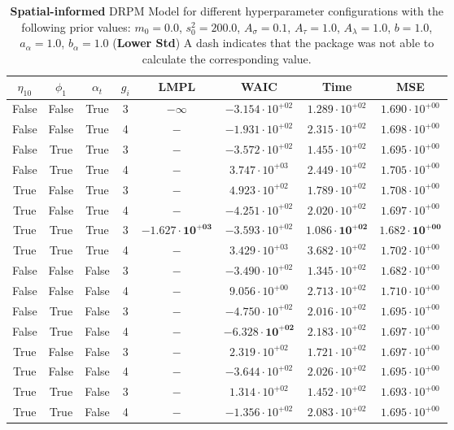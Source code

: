 \documentclass[12pt,a4paper]{article}
\begin{document}
\begin{table}
\caption{\textbf{Spatial-informed} DRPM Model for different hyperparameter configurations with the following prior values: $m_0 = 0.0$, $s_0^2 
= 200.0$, $A_\sigma = 0.1$, $A_\tau = 1.0$, $A_\lambda = 1.0$, $b = 1.0$, $a_\alpha = 1.0$, $b_\alpha = 1.0$ (\textbf{Lower Std})
A dash indicates that the package was not able to calculate the corresponding value.}
\centering\begin{tabular}{cccccccc}
\toprule
$\eta_{10}$ & $\phi_1$ & $\alpha_t$ & $g_i$ & LMPL & WAIC & Time & MSE \\
\midrule
False & False & True & 3 & $-\infty$ & $-3.154 \cdot 10^{+02}$ & $1.289 \cdot 10^{+02}$ & $1.690 \cdot 10^{+00}$ \\
False & False & True & 4 & $-$ & $-1.931 \cdot 10^{+02}$ & $2.315 \cdot 10^{+02}$ & $1.698 \cdot 10^{+00}$ \\
False & True & True & 3 & $-$ & $-3.572 \cdot 10^{+02}$ & $1.455 \cdot 10^{+02}$ & $1.695 \cdot 10^{+00}$ \\
False & True & True & 4 & $-$ & $3.747 \cdot 10^{+03}$ & $2.449 \cdot 10^{+02}$ & $1.705 \cdot 10^{+00}$ \\
True & False & True & 3 & $-$ & $4.923 \cdot 10^{+02}$ & $1.789 \cdot 10^{+02}$ & $1.708 \cdot 10^{+00}$ \\
True & False & True & 4 & $-$ & $-4.251 \cdot 10^{+02}$ & $2.020 \cdot 10^{+02}$ & $1.697 \cdot 10^{+00}$ \\
True & True & True & 3 & $\mathbf{-1.627 \cdot 10^{+03}}$ & $-3.593 \cdot 10^{+02}$ & $\mathbf{1.086 \cdot 10^{+02}}$ & $\mathbf{1.682 \cdot 10^{+00}}$ \\
True & True & True & 4 & $-$ & $3.429 \cdot 10^{+03}$ & $3.682 \cdot 10^{+02}$ & $1.702 \cdot 10^{+00}$ \\
False & False & False & 3 & $-$ & $-3.490 \cdot 10^{+02}$ & $1.345 \cdot 10^{+02}$ & $1.682 \cdot 10^{+00}$ \\
False & False & False & 4 & $-$ & $9.056 \cdot 10^{+00}$ & $2.713 \cdot 10^{+02}$ & $1.710 \cdot 10^{+00}$ \\
False & True & False & 3 & $-$ & $-4.750 \cdot 10^{+02}$ & $2.016 \cdot 10^{+02}$ & $1.695 \cdot 10^{+00}$ \\
False & True & False & 4 & $-$ & $\mathbf{-6.328 \cdot 10^{+02}}$ & $2.183 \cdot 10^{+02}$ & $1.697 \cdot 10^{+00}$ \\
True & False & False & 3 & $-$ & $2.319 \cdot 10^{+02}$ & $1.721 \cdot 10^{+02}$ & $1.697 \cdot 10^{+00}$ \\
True & False & False & 4 & $-$ & $-3.644 \cdot 10^{+02}$ & $2.026 \cdot 10^{+02}$ & $1.695 \cdot 10^{+00}$ \\
True & True & False & 3 & $-$ & $1.314 \cdot 10^{+02}$ & $1.452 \cdot 10^{+02}$ & $1.693 \cdot 10^{+00}$ \\
True & True & False & 4 & $-$ & $-1.356 \cdot 10^{+02}$ & $2.083 \cdot 10^{+02}$ & $1.695 \cdot 10^{+00}$ \\
\bottomrule
\end{tabular}
\label{tab:DRPMExtensionLowerStd}
\end{table}
\end{document}
